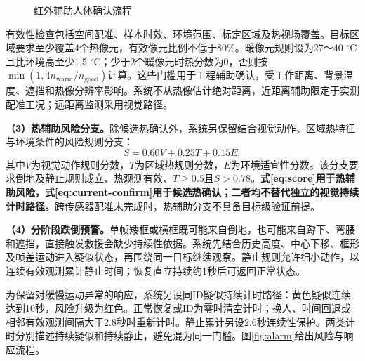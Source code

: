 \documentclass[UTF8,a4paper,zihao=-4,fontset=none,scheme=plain]{ctexart}
\begin{document}
\begin{figure}[H]
 \centering
 \caption{红外辅助人体确认流程}\label{fig:ir-assist}
\end{figure}

有效性检查包括空间配准、样本时效、环境范围、标定区域及热视场覆盖。目标区域要求至少覆盖4个热像元，有效像元比例不低于80\%。暖像元规则设为27～40 $^\circ$C且比环境高至少1.5 $^\circ$C；少于2个暖像元时热分数为0，否则按$\min(1,4n_{\mathrm{warm}}/n_{\mathrm{good}})$计算。这些门槛用于工程辅助确认，受工作距离、背景温度、遮挡和热像分辨率影响。系统不从热像估计绝对距离，近距离辅助限定于实测配准工况；远距离监测采用视觉路径。

\textbf{（3）热辅助风险分支。}除候选热确认外，系统另保留结合视觉动作、区域热特征与环境条件的风险规则分支：
\begin{equation}
 S=0.60V+0.25T+0.15E,
 \label{eq:score}
\end{equation}
其中$V$为视觉动作规则分数，$T$为区域热规则分数，$E$为环境适宜性分数。该分支要求倒地及静止规则成立、热观测有效、$T\geq0.5$且$S>0.78$。\textbf{式\eqref{eq:score}用于热辅助风险，式\eqref{eq:current-confirm}用于候选热确认；二者均不替代独立的视觉持续计时路径。}跨传感器配准未完成时，热辅助分支不具备目标级验证前提。

\textbf{（4）分阶段跌倒预警。}单帧矮框或横框既可能来自倒地，也可能来自蹲下、弯腰和遮挡，直接触发救援会缺少持续性依据。系统先结合历史高度、中心下移、框形及帧差运动进入疑似状态，再围绕同一目标继续观察。静止规则允许细小动作，以连续有效观测累计静止时间；恢复直立持续约1秒后可返回正常状态。

为保留对缓慢运动异常的响应，系统另设同ID疑似持续计时路径：黄色疑似连续达到10秒，风险升级为红色。正常恢复或ID为零时清空计时；换人、时间回退或相邻有效观测间隔大于2.8秒时重新计时。静止累计另设2.6秒连续性保护。两类计时分别描述持续疑似和持续静止，避免混为同一门槛。图\ref{fig:alarm}给出风险与响应流程。
\end{document}
